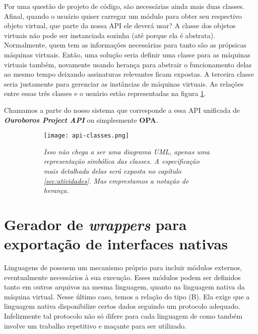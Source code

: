     Por uma questão de projeto de código, são necessárias ainda mais duas
    classes. Afinal, quando o usuário quiser carregar um módulo para obter seu
    respectivo objeto virtual, que parte da nossa API ele deverá usar? A classe
    dos objetos virtuais não pode ser instanciada sozinha (até porque ela é
    abstrata). Normalmente, quem tem as informações necessárias para tanto são
    as própsicas máquinas virtuais. Então, uma solução seria definir uma classe
    para as máquinas virtuais também, novamente usando herança para abstrair o
    funcionamento delas ao mesmo tempo deixando assinaturas relevantes ficam
    expostas. A terceira classe seria justamente para gerenciar as instâncias de
    máquinas virtuais. As relações entre essas três classes e o usuário estão
    representadas na figura \ref{fig:api-classes}.

    Chamamos a parte do nosso sistema que corresponde a essa API unificada de
    \emph{\textbf{Ouroboros Project API}} ou simplesmente \textbf{OPA}.

    \begin{figure}[ht]
      \centering
      \caption{}
      \begin{subfigure}{.8\textwidth}
        \begin{center}
          \texttt{[image: api-classes.png]}
          \vspace{1em}
        \end{center}
        \textit{
          Isso não chega a ser uma diagrama UML, apenas uma representação
          simbólica das classes. A especificação mais detalhada delas será
          exposta no capítulo \ref{sec:atividades}. Mas emprestamos a notação
          de herança.
        }
      \end{subfigure}
      \label{fig:api-classes}
    \end{figure}
  
  \section{Gerador de \textit{wrappers} para exportação de interfaces nativas}
  \label{sec:estrutura:opwig}


    Linguagens de \script{} possuem um mecanismo próprio para incluir módulos
    externos, eventualmente necessários à sua execução. Esses módulos podem ser
    definidos tanto em outros arquivos na mesma linguagem, quanto na linguagem
    nativa da máquina virtual. Nesse último caso, temos a relação do tipo (B). Ela
    exige que a linguagem nativa disponibilize certos dados seguindo um protocolo
    adequado. Infelizmente tal protocolo não só difere para cada linguagem de
    \script{} como também involve um trabalho repetitivo e maçante para ser utilizado. 

